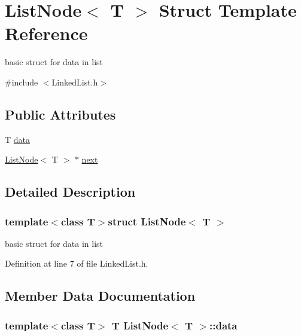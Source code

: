 \hypertarget{structListNode}{\section{List\-Node$<$ T $>$ Struct Template Reference}
\label{structListNode}
}


basic struct for data in list  




{\ttfamily \#include $<$Linked\-List.\-h$>$}

\subsection*{Public Attributes}
\begin{DoxyCompactItemize}
\item 
T \hyperlink{structListNode_a935e06f21b246fb3a0987dd3f9d28528}{data}
\item 
\hyperlink{structListNode}{List\-Node}$<$ T $>$ $\ast$ \hyperlink{structListNode_a97909c9598053ffd24b77ec715f745f1}{next}
\end{DoxyCompactItemize}


\subsection{Detailed Description}
\subsubsection*{template$<$class T$>$struct List\-Node$<$ T $>$}

basic struct for data in list 

Definition at line 7 of file Linked\-List.\-h.



\subsection{Member Data Documentation}
\hypertarget{structListNode_a935e06f21b246fb3a0987dd3f9d28528}{
\subsubsection[{data}]{\setlength{\rightskip}{0pt plus 5cm}template$<$class T$>$ T {\bf List\-Node}$<$ T $>$\-::data}}\label{structListNode_a935e06f21b246fb3a0987dd3f9d28528}


